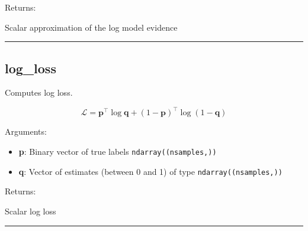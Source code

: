 Returns:

Scalar approximation of the log model evidence

\begin{center}\rule{0.5\linewidth}{\linethickness}\end{center}

\subsection{log\_loss}\label{log_loss}

\begin{Shaded}
\begin{Highlighting}[]
\end{Highlighting}
\end{Shaded}

Computes log loss.

\[
\mathcal L = \mathbf p^\top \log \mathbf q + (1-\mathbf p)^\top \log (1 - \mathbf q)
\]

Arguments:

\begin{itemize}
\tightlist
\item
  \textbf{p}: Binary vector of true labels \texttt{ndarray((nsamples,))}
\item
  \textbf{q}: Vector of estimates (between 0 and 1) of type
  \texttt{ndarray((nsamples,))}
\end{itemize}

Returns:

Scalar log loss

\begin{center}\rule{0.5\linewidth}{\linethickness}\end{center}
